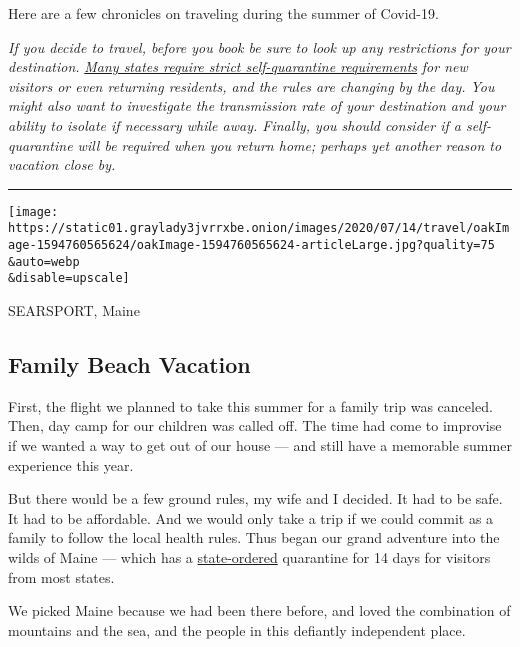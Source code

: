 Here are a few chronicles on traveling during the summer of Covid-19.

\emph{If you decide to travel, before you book be sure to look up any
restrictions for your destination.}
\href{http://nytimes3xbfgragh.onion/2020/07/10/travel/state-travel-restrictions.html}{\emph{Many
states require strict self-quarantine requirements}} \emph{for new
visitors or even returning residents, and the rules are changing by the
day. You might also want to investigate the transmission rate of your
destination and your ability to isolate if necessary while away.
Finally, you should consider if a self-quarantine will be required when
you return home; perhaps yet another reason to vacation close by.}

\begin{center}\rule{0.5\linewidth}{\linethickness}\end{center}

\texttt{[image: https://static01.graylady3jvrrxbe.onion/images/2020/07/14/travel/oakImage-1594760565624/oakImage-1594760565624-articleLarge.jpg?quality=75\\\&auto=webp\\\&disable=upscale]}

SEARSPORT, Maine

\hypertarget{family-beach-vacation}{%
\subsection{Family Beach Vacation}\label{family-beach-vacation}}

First, the flight we planned to take this summer for a family trip was
canceled. Then, day camp for our children was called off. The time had
come to improvise if we wanted a way to get out of our house --- and
still have a memorable summer experience this year.

But there would be a few ground rules, my wife and I decided. It had to
be safe. It had to be affordable. And we would only take a trip if we
could commit as a family to follow the local health rules. Thus began
our grand adventure into the wilds of Maine --- which has a
\href{https://www.maine.gov/governor/mills/sites/maine.gov.governor.mills/files/inline-files/An\%20Order\%20Establishing\%20Quarantine\%20Restrictions\%20On\%20Travelers\%20Arriving\%20in\%20Maine.pdf}{state-ordered}
quarantine for 14 days for visitors from most states.

We picked Maine because we had been there before, and loved the
combination of mountains and the sea, and the people in this defiantly
independent place.

